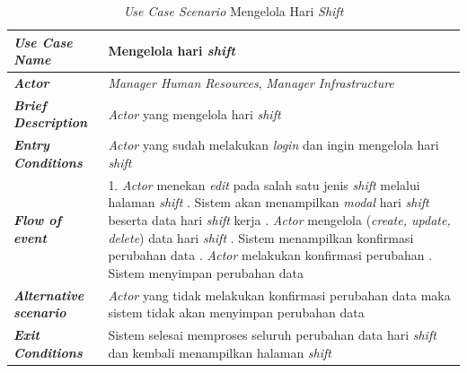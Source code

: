 \FloatBarrier
\begin{longtable}{ |p{6cm}|p{8cm}|}
\caption{\textit{Use Case Scenario} Mengelola Hari \textit{Shift}}\label{tab:use-case-scenario-mengelola-hari-shift} 
\\
\hline
\textbf{\textit{Use Case Name}}
&Mengelola hari \textit{shift}
\\ \hline

\textbf{\textit{Actor}}
&\textit{Manager Human Resources}, \textit{Manager Infrastructure}
\\ \hline

\textbf{\textit{Brief Description}}
&\textit{Actor} yang mengelola hari \textit{shift}
\\ \hline

\textbf{\textit{Entry Conditions}}
&\textit{Actor} yang sudah melakukan \textit{login} dan ingin mengelola hari \textit{shift}
\\ \hline

\textbf{\textit{Flow of event}}
&1. \textit{Actor} menekan \textit{edit} pada salah satu jenis \textit{shift} melalui halaman \textit{shift}
\newline
2. Sistem akan menampilkan \textit{modal} hari \textit{shift} beserta data hari \textit{shift} kerja
\newline
3. \textit{Actor} mengelola (\textit{create, update, delete}) data hari \textit{shift}
    \newline
4. Sistem menampilkan konfirmasi perubahan data
\newline
5. \textit{Actor} melakukan konfirmasi perubahan
\newline
6. Sistem menyimpan perubahan data
\newline
\\ \hline

\textbf{\textit{Alternative scenario}}
&\textit{Actor} yang tidak melakukan konfirmasi perubahan data maka sistem tidak akan menyimpan perubahan data
\\ \hline

\textbf{\textit{Exit Conditions}}
&Sistem selesai memproses seluruh perubahan data hari \textit{shift} dan kembali menampilkan halaman \textit{shift}
\\ \hline
\end{longtable}

